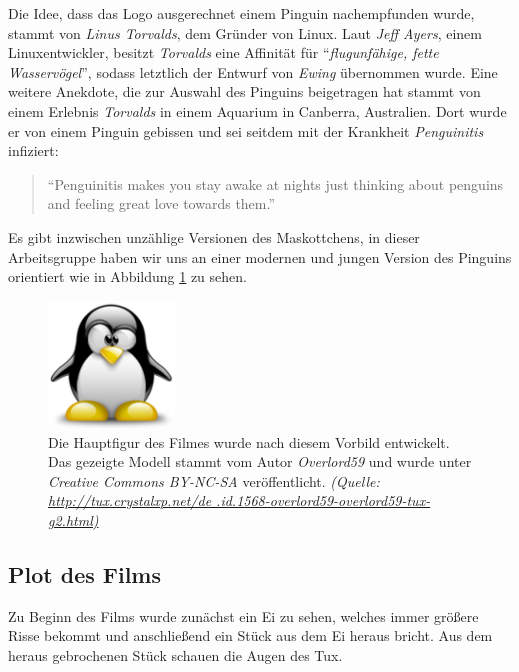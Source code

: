 \documentclass[11pt,parskip]{scrartcl}
\begin{document}
Die Idee, dass das Logo ausgerechnet einem Pinguin nachempfunden wurde, stammt
von \emph{Linus Torvalds}, dem Gründer von Linux. Laut \emph{Jeff Ayers}, einem
Linuxentwickler, besitzt \emph{Torvalds} eine Affinität für
\enquote{\emph{flugunfähige, fette Wasservögel}}, sodass letztlich der Entwurf
von \emph{Ewing} übernommen wurde. Eine weitere Anekdote, die zur Auswahl des
Pinguins beigetragen hat stammt von einem Erlebnis \emph{Torvalds} in einem
Aquarium in Canberra, Australien. Dort wurde er von einem Pinguin gebissen und
sei seitdem mit der Krankheit \emph{Penguinitis} infiziert:

\begin{quote}
  \enquote{Penguinitis makes you stay awake at nights just thinking about
    penguins and feeling great love towards them.} \cite{tuxstory}
\end{quote}

Es gibt inzwischen unzählige Versionen des Maskottchens, in dieser
Arbeitsgruppe haben wir uns an einer modernen und jungen Version des Pinguins
orientiert wie in Abbildung \ref{fig:overlord59tux} zu sehen.

\begin{figure}[htbp]
  \centering
  \includegraphics[width=0.3\textwidth]{./fig/overlord59tux.pdf}
  \caption{
    Die Hauptfigur des Filmes wurde nach diesem Vorbild entwickelt. Das
    gezeigte Modell stammt vom Autor \emph{Overlord59} und wurde unter
    \emph{Creative Commons BY-NC-SA} veröffentlicht.
    \emph{
      (Quelle:
      \url{http://tux.crystalxp.net/de
        .id.1568-overlord59-overlord59-tux-g2.html)
      }
    }
  }
  \label{fig:overlord59tux}
\end{figure}


\subsection{Plot des Films}
Zu Beginn des Films wurde zunächst ein Ei zu sehen, welches immer größere Risse
bekommt und anschließend ein Stück aus dem Ei heraus bricht. Aus dem
heraus gebrochenen Stück schauen die Augen des Tux.
\end{document}
